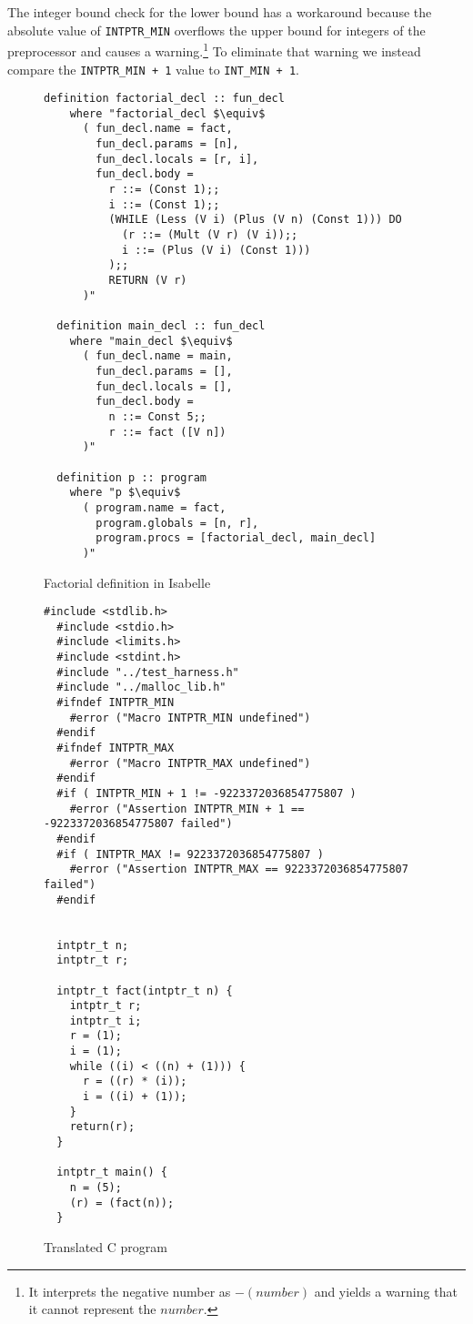 The integer bound check for the lower bound has a workaround because the absolute value of \verb|INTPTR_MIN| overflows the upper bound for integers of the preprocessor and causes a warning.\footnote{It interprets the negative number as $-(number)$ and yields a warning that it cannot represent the $number$.}
To eliminate that warning we instead compare the \verb|INTPTR_MIN + 1| value to \verb|INT_MIN + 1|.


\begin{figure}
\begin{lstlisting}[mathescape=true]
  definition factorial_decl :: fun_decl
    where "factorial_decl $\equiv$
      ( fun_decl.name = fact,
        fun_decl.params = [n],
        fun_decl.locals = [r, i],
        fun_decl.body =
          r ::= (Const 1);;
          i ::= (Const 1);;
          (WHILE (Less (V i) (Plus (V n) (Const 1))) DO
            (r ::= (Mult (V r) (V i));;
            i ::= (Plus (V i) (Const 1)))
          );;
          RETURN (V r)
      )"

  definition main_decl :: fun_decl
    where "main_decl $\equiv$
      ( fun_decl.name = main,
        fun_decl.params = [],
        fun_decl.locals = [],
        fun_decl.body =
          n ::= Const 5;;
          r ::= fact ([V n])
      )"

  definition p :: program
    where "p $\equiv$
      ( program.name = fact,
        program.globals = [n, r],
        program.procs = [factorial_decl, main_decl]
      )"
\end{lstlisting}
\caption{Factorial definition in Isabelle}
\label{fig:factorial_isabelle}
\end{figure}


\begin{figure}
\begin{lstlisting}[mathescape=true]
  #include <stdlib.h>
  #include <stdio.h>
  #include <limits.h>
  #include <stdint.h>
  #include "../test_harness.h"
  #include "../malloc_lib.h"
  #ifndef INTPTR_MIN
    #error ("Macro INTPTR_MIN undefined")
  #endif
  #ifndef INTPTR_MAX
    #error ("Macro INTPTR_MAX undefined")
  #endif
  #if ( INTPTR_MIN + 1 != -9223372036854775807 )
    #error ("Assertion INTPTR_MIN + 1 == -9223372036854775807 failed")
  #endif
  #if ( INTPTR_MAX != 9223372036854775807 )
    #error ("Assertion INTPTR_MAX == 9223372036854775807 failed")
  #endif


  intptr_t n;
  intptr_t r;

  intptr_t fact(intptr_t n) {
    intptr_t r;
    intptr_t i;
    r = (1);
    i = (1);
    while ((i) < ((n) + (1))) {
      r = ((r) * (i));
      i = ((i) + (1));
    }
    return(r);
  }

  intptr_t main() {
    n = (5);
    (r) = (fact(n));
  }
\end{lstlisting}
\caption{Translated C program}
\label{fig:factorial_c}
\end{figure}

